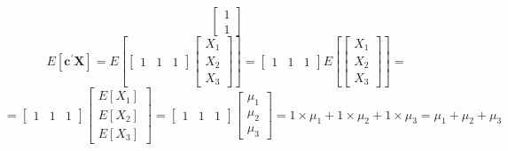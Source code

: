 \begin{enumerate}[label=(\alph*)]
\[\begin{bmatrix}
                    1 \\
                    1
                \end{bmatrix}
            \]
            \[
                E\left[\textbf{c}^\prime\textbf{X}\right]
                =
                E\left[
                \begin{bmatrix}
                    1 & 1 & 1
                \end{bmatrix}
                    \begin{bmatrix}
                    X_1 \\
                    X_2 \\
                    X_3
                \end{bmatrix}
                \right]
                =
                \begin{bmatrix}
                    1 & 1 & 1
                \end{bmatrix}                
                E\left[
                \begin{bmatrix}
                    X_1 \\
                    X_2 \\
                    X_3
                \end{bmatrix}
                \right]
                =
            \]
            \[
                =
                \begin{bmatrix}
                    1 & 1 & 1
                \end{bmatrix}                
                \begin{bmatrix}
                    E\left[X_1\right] \\
                    E\left[X_2\right] \\
                    E\left[X_3\right]
                \end{bmatrix}
                =
                \begin{bmatrix}
                    1 & 1 & 1
                \end{bmatrix}                
                \begin{bmatrix}
                    \mu_1 \\
                    \mu_2 \\
                    \mu_3
                \end{bmatrix}
                =
                1 \times \mu_1 + 1 \times \mu_2 + 1 \times \mu_3
                =
                \mu_1 + \mu_2 + \mu_3
            \]

\end{enumerate}
